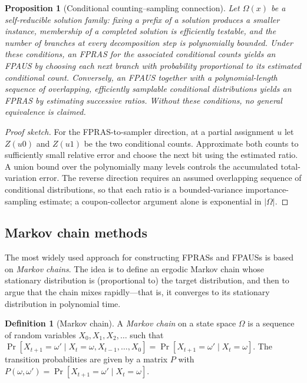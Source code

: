\documentclass[twoside,12pt]{book}
\theoremstyle{plain}
\newtheorem{proposition}[theorem]{Proposition}
\theoremstyle{definition}
\newtheorem{definition}[theorem]{Definition}
\theoremstyle{remark}
\begin{document}
\begin{proposition}[Conditional counting--sampling connection]
\label{prop:count-sampling}
Let $\Omega(x)$ be a self-reducible solution family: fixing a prefix of a
solution produces a smaller instance, membership of a completed solution is
efficiently testable, and the number of branches at every decomposition step
is polynomially bounded. Under these conditions, an FPRAS for the associated
conditional counts yields an FPAUS by choosing each next branch with
probability proportional to its estimated conditional count. Conversely, an
FPAUS together with a polynomial-length sequence of overlapping, efficiently
samplable conditional distributions yields an FPRAS by estimating successive
ratios. Without these conditions, no general equivalence is claimed.
\end{proposition}

\begin{proof}[Proof sketch]
For the FPRAS-to-sampler direction, at a partial assignment $u$ let
$Z(u0)$ and $Z(u1)$ be the two conditional counts. Approximate both counts
to sufficiently small relative error and choose the next bit using the
estimated ratio. A union bound over the polynomially many levels controls the
accumulated total-variation error. The reverse direction requires an assumed
overlapping sequence of conditional distributions, so that each ratio is a
bounded-variance importance-sampling estimate; a coupon-collector argument
alone is exponential in $|\Omega|$.
\end{proof}

\subsection{Markov chain methods}

The most widely used approach for constructing FPRASs and FPAUSs is based on \emph{Markov chains}. The idea is to define an ergodic Markov chain whose stationary distribution is (proportional to) the target distribution, and then to argue that the chain mixes rapidly---that is, it converges to its stationary distribution in polynomial time.

\begin{definition}[Markov chain]
A \emph{Markov chain} on a state space $\Omega$ is a sequence of random variables $X_0, X_1, X_2, \ldots$ such that $\Pr[X_{t+1} = \omega' \mid X_t = \omega, X_{t-1}, \ldots, X_0] = \Pr[X_{t+1} = \omega' \mid X_t = \omega]$. The transition probabilities are given by a matrix $P$ with $P(\omega, \omega') = \Pr[X_{t+1} = \omega' \mid X_t = \omega]$.
\end{definition}
\end{document}

